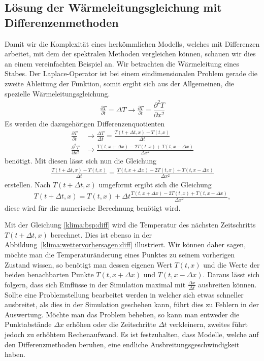 \begin{refsection}
\subsection{Lösung der Wärmeleitungsgleichung mit Differenzenmethoden}
Damit wir die Komplexität eines herkömmlichen Modells, welches mit
Differenzen arbeitet, mit dem der spektralen Methoden vergleichen
können, schauen wir dies an einem vereinfachten Beispiel an. Wir
betrachten die Wärmeleitung eines Stabes.
Der Laplace-Operator ist bei einem eindimensionalen Problem gerade
die zweite Ableitung der Funktion, somit ergibt sich aus der
Allgemeinen, die spezielle Wärmeleitungsgleichung.
%
\begin{align}
\frac{\partial T}{\partial t} = \Delta T \rightarrow \frac{\partial T}{\partial t}=\dfrac{\partial^2 T}{\partial x^2}
\end{align}
Es werden die dazugehörigen Differenzenquotienten
%
\begin{align}
\frac{\partial T}{\partial t}
&\rightarrow
\frac{\Delta T}{\Delta t}=
\frac{T(t+\Delta t,x)-T(t,x)}{\Delta t}
\\
\frac{\partial^2 T}{\partial x^2}
&\rightarrow
\frac{T(t,x+\Delta x)-2T(t,x)+T(t,x-\Delta x)}{\Delta x^2}
\end{align}
benötigt. Mit diesen lässt sich nun die Gleichung
\begin{align}
\frac{T(t+\Delta t,x)-T(t,x)}{\Delta t}
=
\frac{T(t,x+\Delta x)-2T(t,x)+T(t,x-\Delta x)}{\Delta x^2}
\end{align}
erstellen. Nach $T(t+\Delta t,x)$ umgeformt ergibt sich die Gleichung
\begin{align}
T(t+\Delta t,x)
=
T(t,x)+\Delta t \frac{T(t,x+\Delta x)-2T(t,x)+T(t,x-\Delta x)}{\Delta x^2},
\label{klima:bsp:diff}
\end{align}
diese wird für die numerische Berechnung benötigt wird.

Mit der Gleichung \eqref{klima:bsp:diff} wird die Temperatur des
nächsten Zeitschritts $T(t+\Delta t,x)$ berechnet. Dies ist ebenso
in der Abbildung~\ref{klima:wettervorhersagen:diff} illustriert.
Wir können daher sagen, möchte man die Temperaturänderung eines
Punktes zu seinem vorherigen Zustand wissen, so benötigt man dessen
eigenen Wert $T(t,x)$ und die Werte der beiden benachbarten Punkte
$T(t,x+\Delta x)$ und $T(t,x-\Delta x)$. Daraus lässt sich folgern,
dass sich Einflüsse in der Simulation maximal mit $\frac{\Delta
x}{\Delta t}$ ausbreiten können. Sollte eine Problemstellung
bearbeitet werden in welcher sich etwas schneller ausbreitet, als
dies in der Simulation geschehen kann, führt dies zu Fehlern in der
Auswertung. Möchte man das Problem beheben, so kann man entweder
die Punktabstände $\Delta x$ erhöhen oder die Zeitschritte $\Delta
t$ verkleinern, zweites führt jedoch zu erhöhtem Rechenaufwand. Es
ist festzuhalten, dass Modelle, welche auf den Differenzmethoden
beruhen, eine endliche Ausbreitungsgeschwindigkeit haben.


\end{refsection}
